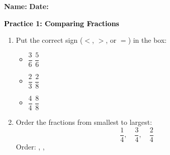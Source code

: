 \documentclass[12pt, letterpaper, fleqn]{article}
\newcommand{\blank}{\underline{\hspace{2.2cm}}}
\begin{document}
\textbf{Name:} \underline{\hspace{5cm}}
\hfill
\textbf{Date:} \underline{\hspace{3cm}}\\

\begin{tcolorbox}[colback=customteal!20]
    \large\textcolor{black}{\textbf{Practice 1: Comparing Fractions}}
\end{tcolorbox}

\vspace{5mm}
\begin{enumerate}[itemsep=2cm, leftmargin=0.6cm]
\item Put the correct sign ($<$, $>$, or $=$) in the box:
  \begin{itemize}[itemsep=0.8cm]
    \item $\dfrac{3}{6}$ \quad \blank \quad $\dfrac{5}{6}$
    \item $\dfrac{2}{3}$ \quad \blank \quad $\dfrac{2}{8}$
    \item $\dfrac{4}{4}$ \quad \blank \quad $\dfrac{8}{8}$
  \end{itemize}

\item Order the fractions from smallest to largest:
\[
  \frac{1}{4}, \quad \frac{3}{4}, \quad \frac{2}{4}
\]
Order: \blank, \blank, \blank
\end{enumerate}
\end{document}
